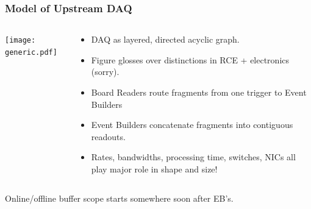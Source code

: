 \documentclass[xcolor=dvipsnames]{beamer}
\begin{document}



\begin{frame}
  \frametitle{Model of Upstream DAQ}
  \begin{columns}
    \begin{column}{0.5\textwidth}
      \begin{center}
        \texttt{[image: generic.pdf]}
      \end{center}
    \end{column}
    \begin{column}{0.5\textwidth}
      \begin{itemize}\footnotesize
        \item DAQ as layered, directed acyclic graph.
        \item Figure glosses over distinctions in RCE + electronics (sorry).
        \item Board Readers route fragments from one trigger to Event Builders
        \item Event Builders concatenate fragments into contiguous readouts.
        \item Rates, bandwidths, processing time, switches, NICs all play major role in shape and size!
      \end{itemize}
    \end{column}
  \end{columns}
  \begin{center}
    Online/offline buffer scope starts somewhere soon after EB's.
  \end{center}
\end{frame}
\end{document}
